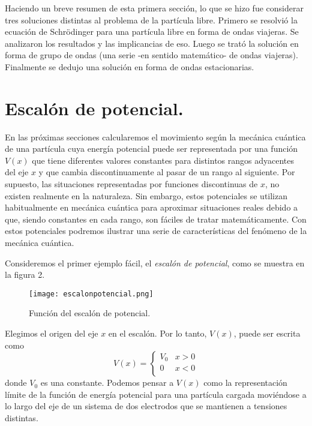 \documentclass[12pt,a4paper]{article}
\begin{document}
Haciendo un breve resumen de esta primera sección, lo que se hizo fue considerar tres soluciones distintas al problema de la partícula libre. Primero se resolvió la ecuación de Schrödinger para una partícula libre en forma de ondas viajeras. Se analizaron los resultados y las implicancias de eso. Luego se trató la solución en forma de grupo de ondas (una serie -en sentido matemático- de ondas viajeras). Finalmente se dedujo una solución en forma de ondas estacionarias.

\section{Escalón de potencial.}

En las próximas secciones calcularemos el movimiento según la mecánica cuántica de una partícula cuya energía potencial puede ser representada por una función $V(x)$ que tiene diferentes valores constantes para distintos rangos adyacentes del eje $x$ y que cambia discontinuamente al pasar de un rango al siguiente. Por supuesto, las situaciones representadas por funciones discontinuas de $x$, no existen realmente en la naturaleza. Sin embargo, estos potenciales se utilizan habitualmente en mecánica cuántica para aproximar situaciones reales debido a que, siendo constantes en cada rango, son fáciles de tratar matemáticamente. Con estos potenciales podremos ilustrar una serie de características del fenómeno de la mecánica cuántica.

Consideremos el primer ejemplo fácil, el \emph{escalón de potencial}, como se muestra en la figura 2.

\begin{figure}[ht!]
\begin{center}
\texttt{[image: escalonpotencial.png]}
\caption{Función del escalón de potencial.}
\end{center}
\end{figure}

Elegimos el origen del eje $x$ en el escalón. Por lo tanto, $V(x)$, puede ser escrita como
\[
V(x)=
\left\{
\begin{array}{ll}
V_{0} & x>0 \\
0 & x<0 \\
\end{array}
\right.
\]
donde $V_{0}$ es una constante. Podemos pensar a $V(x)$ como la representación límite de la función de energía potencial para una partícula cargada moviéndose a lo largo del eje de un sistema de dos electrodos que se mantienen a tensiones distintas.
\end{document}
